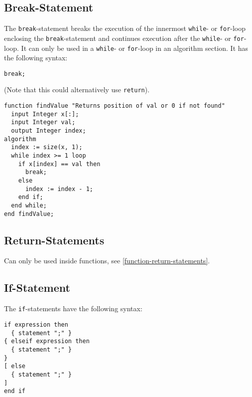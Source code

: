 \subsection{Break-Statement}\label{break-statement}

The \lstinline!break!-statement breaks the execution of the innermost \lstinline!while!- or \lstinline!for!-loop enclosing the \lstinline!break!-statement and continues execution after the \lstinline!while!- or \lstinline!for!-loop.
It can only be used in a \lstinline!while!- or \lstinline!for!-loop in an algorithm section.
It has the following syntax:
\begin{lstlisting}[language=modelica]
break;
\end{lstlisting}

\begin{example}
(Note that this could alternatively use \lstinline!return!).
\begin{lstlisting}[language=modelica]
function findValue "Returns position of val or 0 if not found"
  input Integer x[:];
  input Integer val;
  output Integer index;
algorithm
  index := size(x, 1);
  while index >= 1 loop
    if x[index] == val then
      break;
    else
      index := index - 1;
    end if;
  end while;
end findValue;
\end{lstlisting}
\end{example}

\subsection{Return-Statements}\label{return-statements}

Can only be used inside functions, see \cref{function-return-statements}.

\subsection{If-Statement}\label{if-statement}

The \lstinline!if!-statements have the following syntax:
\begin{lstlisting}[language=grammar]
if expression then
  { statement ";" }
{ elseif expression then
  { statement ";" }
}
[ else
  { statement ";" }
]
end if
\end{lstlisting}

